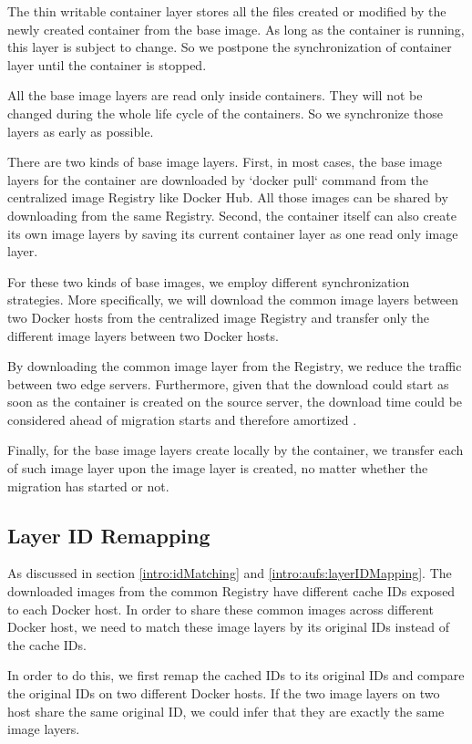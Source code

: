 The thin writable container layer stores all the files created or modified by the newly created container from the base image. As long as the container is running, this layer is subject to change. So we postpone the synchronization of container layer until the container is stopped.

All the base image layers are read only inside containers. They will not be changed during the whole life cycle of the containers. So we synchronize those layers as early as possible.

There are two kinds of base image layers. First, in most cases, the base image layers for the container are downloaded by `docker pull` command from the centralized image Registry like Docker Hub. All those images can be shared by downloading from the same Registry. Second, the container itself can also create its own image layers by saving its current container layer as one read only image layer. 

For these two kinds of base images, we employ different synchronization strategies. More specifically, we will download the common image layers between two Docker hosts from the centralized image Registry and transfer only the different image layers between two Docker hosts.

By downloading the common image layer from the Registry, we reduce the traffic between two edge servers. Furthermore, given that the download could start as soon as the container is created on the source server, the download time could be considered ahead of migration starts and therefore amortized .

Finally, for the base image layers create locally by the container, we transfer each of such image layer upon the image layer is created, no matter whether the migration has started or not. 

\subsection{Layer ID Remapping} \label{idremapping}

As discussed in section \ref{intro:idMatching} and \ref{intro:aufs:layerIDMapping}. The downloaded images from the common Registry have different cache IDs exposed to each Docker host. In order to share these common images across different Docker host, we need to match these image layers by its original IDs instead of the cache IDs.

In order to do this, we first remap the cached IDs to its original IDs and compare the original IDs on two different Docker hosts. If the two image layers on two host share the same original ID, we could infer that they are exactly the same image layers. 


